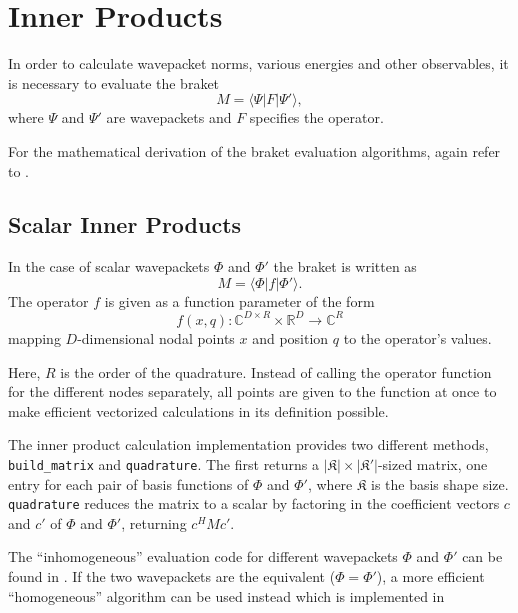 \section{Inner Products}

In order to calculate wavepacket norms, various energies and other observables,
it is necessary to evaluate the braket
\begin{equation}
  \label{eq:braket}
  M = \langle \Psi | F | \Psi' \rangle,
\end{equation}
where $\Psi$ and $\Psi'$ are wavepackets and $F$ specifies the operator.

For the mathematical derivation of the braket evaluation algorithms, again refer
to \cite{B_master_thesis}.


\subsection{Scalar Inner Products}

In the case of scalar wavepackets $\Phi$ and $\Phi'$ the braket is written as
\begin{equation}
  M = \langle \Phi | f | \Phi' \rangle.
\end{equation}
The operator $f$ is given as a function parameter of the form
\begin{equation}
  f(x, q) : \mathbb{C}^{D \times R} \times \mathbb{R}^D \rightarrow \mathbb{C}^R
\end{equation}
mapping $D$-dimensional nodal points $x$ and position
$q$ to the operator's values.

Here, $R$ is the order of the quadrature.
Instead of calling the operator function for the different nodes separately, all
points are given to the function at once to make efficient vectorized
calculations in its definition possible.

The inner product calculation implementation provides two different methods,
\texttt{build\_matrix} and \texttt{quadrature}.
The first returns a $|\mathfrak{K}| \times |\mathfrak{K'}|$-sized matrix, one
entry for each pair of basis functions of $\Phi$ and $\Phi'$, where
$\mathfrak{K}$ is the basis shape size.
\texttt{quadrature} reduces the matrix to a scalar by factoring in the
coefficient vectors $c$ and $c'$ of $\Phi$ and $\Phi'$, returning $c^H M c'$.

The ``inhomogeneous'' evaluation code for different wavepackets $\Phi$ and
$\Phi'$ can be found in .
If the two wavepackets are the equivalent ($\Phi = \Phi'$), a more efficient
``homogeneous'' algorithm can be used instead which is implemented in


